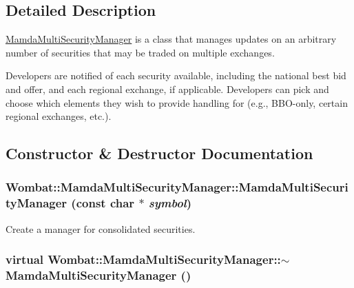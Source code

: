 \subsection{Detailed Description}
\hyperlink{classWombat_1_1MamdaMultiSecurityManager}{Mamda\-Multi\-Security\-Manager} is a class that manages updates on an arbitrary number of securities that may be traded on multiple exchanges. 

Developers are notified of each security available, including the national best bid and offer, and each regional exchange, if applicable. Developers can pick and choose which elements they wish to provide handling for (e.g., BBO-only, certain regional exchanges, etc.). 



\subsection{Constructor \& Destructor Documentation}
\hypertarget{classWombat_1_1MamdaMultiSecurityManager_80f97c60287c0e93b06a557b8ccd021b}{
\subsubsection[MamdaMultiSecurityManager]{\setlength{\rightskip}{0pt plus 5cm}Wombat::Mamda\-Multi\-Security\-Manager::Mamda\-Multi\-Security\-Manager (const char $\ast$ {\em symbol})}}
\label{classWombat_1_1MamdaMultiSecurityManager_80f97c60287c0e93b06a557b8ccd021b}


Create a manager for consolidated securities. 

\hypertarget{classWombat_1_1MamdaMultiSecurityManager_2e68188ad4b4b5a093771428fc5820b4}{
\subsubsection[$\sim$MamdaMultiSecurityManager]{\setlength{\rightskip}{0pt plus 5cm}virtual Wombat::Mamda\-Multi\-Security\-Manager::$\sim$Mamda\-Multi\-Security\-Manager ()}}
\label{classWombat_1_1MamdaMultiSecurityManager_2e68188ad4b4b5a093771428fc5820b4}


